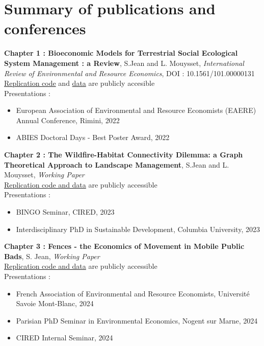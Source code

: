 \clearpage
\section*{Summary of publications and conferences}

\singlespacing
\textbf{Chapter 1 :  Bioeconomic Models for Terrestrial Social Ecological System Management : a Review}, S.Jean and L. Mouysset, \textit{International Review of Environmental and Resource Economics},
 DOI : 10.1561/101.00000131\\
\href{https://github.com/sim-jean/review-irere}{Replication code} and \href{https://zenodo.org/records/6656433}{data} are publicly accesible
\\
 Presentations : 
\begin{itemize}
\item European Association of Environmental and Resource Economists (EAERE) Annual Conference, Rimini, 2022
\item ABIES Doctoral Days - Best Poster Award, 2022
\end{itemize}
%
\textbf{Chapter 2 : The Wildfire-Habitat Connectivity Dilemma: a Graph Theoretical Approach to Landscape Management}, S.Jean and L. Mouysset, \textit{Working Paper}\\
\href{https://github.com/sim-jean/Landscape_connectivity_dilemma}{Replication code and data} are publicly accessible
%
\\
Presentations : 
\begin{itemize}
\item BINGO Seminar, CIRED, 2023
\item Interdisciplinary PhD in Sustainable Development, Columbia University, 2023
\end{itemize}
%
\textbf{Chapter 3 : Fences - the Economics of Movement in Mobile Public Bads}, S. Jean, \textit{Working Paper}\\
\href{https://github.com/sim-jean/fences}{Replication code and data} are publicly accessible
\\
Presentations : 
\begin{itemize}
\item French Association of Environmental and Resource Economists, Université Savoie Mont-Blanc, 2024
\item Parisian PhD Seminar in Environmental Economics, Nogent sur Marne, 2024
\item CIRED Internal Seminar, 2024
\end{itemize}
